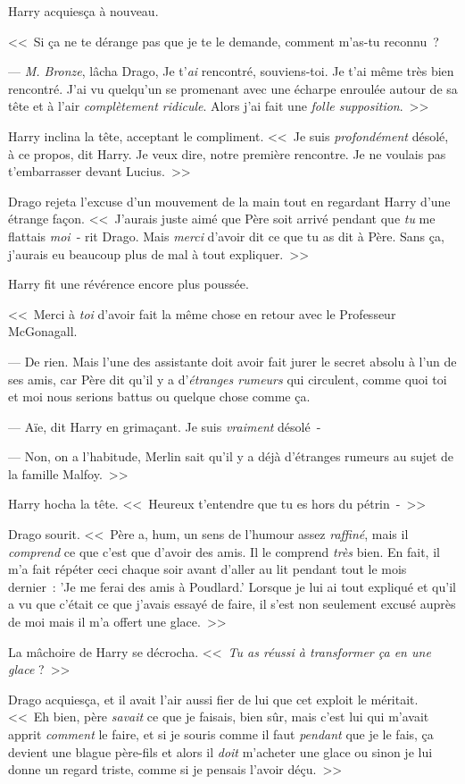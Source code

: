 Harry acquiesça à nouveau.

<<~Si ça ne te dérange pas que je te le demande, comment m'as-tu reconnu~?

--- \emph{M. Bronze}, lâcha Drago, Je t'\emph{ai} rencontré, souviens-toi. Je t'ai même très bien rencontré. J'ai vu quelqu'un se promenant avec une écharpe enroulée autour de sa tête et à l'air \emph{complètement ridicule}. Alors j'ai fait une \emph{folle supposition}.~>>

Harry inclina la tête, acceptant le compliment. <<~Je suis \emph{profondément} désolé, à ce propos, dit Harry. Je veux dire, notre première rencontre. Je ne voulais pas t'embarrasser devant Lucius.~>>

Drago rejeta l'excuse d'un mouvement de la main tout en regardant Harry d'une étrange façon. <<~J'aurais juste aimé que Père soit arrivé pendant que \emph{tu} me flattais \emph{moi}~- rit Drago. Mais \emph{merci} d'avoir dit ce que tu as dit à Père. Sans ça, j'aurais eu beaucoup plus de mal à tout expliquer.~>>

Harry fit une révérence encore plus poussée.

<<~Merci à \emph{toi} d'avoir fait la même chose en retour avec le Professeur McGonagall.

--- De rien. Mais l'une des assistante doit avoir fait jurer le secret absolu à l'un de ses amis, car Père dit qu'il y a d'\emph{étranges rumeurs} qui circulent, comme quoi toi et moi nous serions battus ou quelque chose comme ça.

--- Aïe, dit Harry en grimaçant. Je suis \emph{vraiment} désolé~-

--- Non, on a l'habitude, Merlin sait qu'il y a déjà d'étranges rumeurs au sujet de la famille Malfoy.~>>

Harry hocha la tête. <<~Heureux t'entendre que tu es hors du pétrin~-~>>

Drago sourit. <<~Père a, hum, un sens de l'humour assez \emph{raffiné}, mais il \emph{comprend} ce que c'est que d'avoir des amis. Il le comprend \emph{très} bien. En fait, il m'a fait répéter ceci chaque soir avant d'aller au lit pendant tout le mois dernier~: 'Je me ferai des amis à Poudlard.' Lorsque je lui ai tout expliqué et qu'il a vu que c'était ce que j'avais essayé de faire, il s'est non seulement excusé auprès de moi mais il m'a offert une glace.~>>

La mâchoire de Harry se décrocha. <<~\emph{Tu as réussi à transformer ça en une glace} ?~>>

Drago acquiesça, et il avait l'air aussi fier de lui que cet exploit le méritait. <<~Eh bien, père \emph{savait} ce que je faisais, bien sûr, mais c'est lui qui m'avait apprit \emph{comment} le faire, et si je souris comme il faut \emph{pendant} que je le fais, ça devient une blague père-fils et alors il \emph{doit} m'acheter une glace ou sinon je lui donne un regard triste, comme si je pensais l'avoir déçu.~>>

